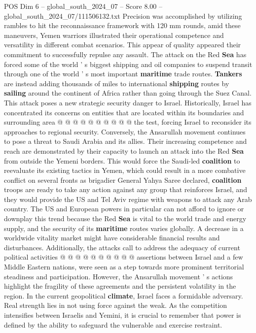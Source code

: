 \begin{textsample}{POS Dim 6 – global\_south\_2024\_07 – Score 8.00 – global\_south\_2024\_07/111506132.txt}
Precision was accomplished by utilizing rambles to hit the reconnaissance framework with 120 mm rounds, amid these maneuvers, Yemen warriors illustrated their operational competence and versatility in different combat scenarios.
This appear of quality appeared their commitment to successfully repulse any assault.
The attack on the Red \textbf{Sea} has forced some of the world ' s biggest shipping and oil companies to suspend transit through one of the world ' s most important \textbf{maritime} trade routes. \textbf{Tankers} are instead adding thousands of miles to international \textbf{shipping} routes by \textbf{sailing} around the continent of Africa rather than going through the Suez Canal.
This attack poses a new strategic security danger to Israel.
Historically, Israel has concentrated its concerns on entities that are located within its boundaries and surrounding area @ @ @ @ @ @ @ @ @ @ the test, forcing Israel to reconsider its approaches to regional security.
Conversely, the Ansarullah movement continues to pose a threat to Saudi Arabia and its allies.
Their increasing competence and reach are demonstrated by their capacity to launch an attack into the Red \textbf{Sea} from outside the Yemeni borders.
This would force the Saudi-led \textbf{coalition} to reevaluate its existing tactics in Yemen, which could result in a more combative conflict on several fronts as brigadier General Yahya Saree declared, \textbf{coalition} troops are ready to take any action against any group that reinforces Israel, and they would provide the US and Tel Aviv regime with weapons to attack any Arab country.
The US and European powers in particular can not afford to ignore or downplay this trend because the Red \textbf{Sea} is vital to the world trade and energy supply, and the security of its \textbf{maritime} routes varies globally.
A decrease in a worldwide vitality market might have considerable financial results and disturbances.
Additionally, the attacks call to address the adequacy of current political activities @ @ @ @ @ @ @ @ @ @ assertions between Israel and a few Middle Eastern nations, were seen as a step towards more prominent territorial steadiness and participation.
However, the Ansarullah movement ' s actions highlight the fragility of these agreements and the persistent volatility in the region.
In the current geopolitical \textbf{climate}, Israel faces a formidable adversary.
Real strength lies in not using force against the weak.
As the competition intensifies between Israelis and Yemini, it is crucial to remember that power is defined by the ability to safeguard the vulnerable and exercise restraint.

\end{textsample}
